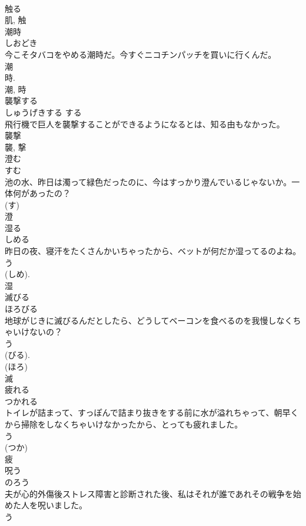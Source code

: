 \documentclass[8pt]{extreport}
\begin{document}
\begin{CJK}{UTF8}{min}
\\	触る
\\	肌, 触	
\\	潮時	
\\	しおどき	
\\	今こそタバコをやめる潮時だ。今すぐニコチンパッチを買いに行くんだ。	
\\	潮 
\\	時. 
\\	潮, 時	
\\	襲撃する	
\\	しゅうげきする	する 
\\	飛行機で巨人を襲撃することができるようになるとは、知る由もなかった。	
\\	襲撃 
\\	襲, 撃	
\\	澄む	
\\	すむ	
\\	池の水、昨日は濁って緑色だったのに、今はすっかり澄んでいるじゃないか。一体何があったの？	
\\	(す) 
\\	澄	
\\	湿る	
\\	しめる	
\\	昨日の夜、寝汗をたくさんかいちゃったから、ベットが何だか湿ってるのよね。	
\\	う 
\\	(しめ). 
\\	湿	
\\	滅びる	
\\	ほろびる	
\\	地球がじきに滅びるんだとしたら、どうしてベーコンを食べるのを我慢しなくちゃいけないの？	
\\	う 
\\	(びる). 
\\	(ほろ) 
\\	滅	
\\	疲れる	
\\	つかれる	
\\	トイレが詰まって、すっぽんで詰まり抜きをする前に水が溢れちゃって、朝早くから掃除をしなくちゃいけなかったから、とっても疲れました。	
\\	う 
\\	(つか) 
\\	疲	
\\	呪う	
\\	のろう	
\\	夫が心的外傷後ストレス障害と診断された後、私はそれが誰であれその戦争を始めた人を呪いました。	
\\	う 

\end{CJK}
\end{document}
